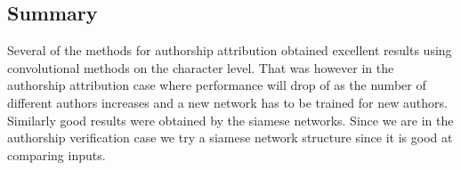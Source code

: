 \subsection{Summary}

Several of the methods for authorship attribution obtained excellent results
using convolutional methods on the character level. That was however in the
authorship attribution case where performance will drop of as the number of
different authors increases and a new network has to be trained for new authors.
Similarly good results were obtained by the siamese networks. Since we are in
the authorship verification case we try a siamese network structure since it is
good at comparing inputs.
